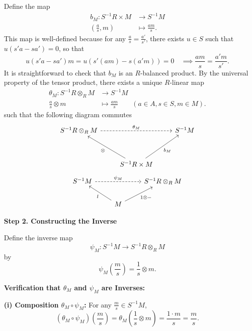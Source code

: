 \begin{prf}
Define the map
\begin{align*}
    b_M: S^{-1}R \times M &\longrightarrow S^{-1}M\\
    \left(\frac{a}{s}, m\right) &\longmapsto \frac{am}{s}.
\end{align*}
This map is well-defined because for any \(\frac{a}{s} = \frac{a'}{s'}\), there exists \(u \in S\) such that \(u(s'a - sa') = 0\), so that 
\[
u(s'a - sa')m = u(s'(am) - s(a'm))=0 \quad \implies \frac{am}{s} = \frac{a'm}{s'}.
\]
It is straightforward to check that \(b_M\) is an \(R\)-balanced product. By the universal property of the tensor product, there exists a unique \(R\)-linear map
\begin{align*}
    \theta_M: S^{-1}R\otimes_R M &\longrightarrow S^{-1}M\\
    \frac{a}{s} \otimes m &\longmapsto \frac{am}{s}\qquad(a \in A, s \in S, m \in M).
\end{align*}
such that the following diagram commutes
\[
    \begin{tikzcd}
        S^{-1}R\otimes_R M \arrow[rr, "\theta_M", dashed] &                                                          & S^{-1}M \\[1.5em]
                                                        & S^{-1}R\times M \arrow[ru, "b_M"'] \arrow[lu, "\otimes"] &        
        \end{tikzcd}
\]
\[
    \begin{tikzcd}
        S^{-1}M \arrow[rr, "\psi_M", dashed] &                                          & S^{-1}R\otimes_R M \\
                                             & M \arrow[lu, "l"] \arrow[ru, "1\otimes -"'] &                   
        \end{tikzcd}
\]

\vspace{1em}
\textbf{Step 2. Constructing the Inverse}

Define the inverse map
\[
\psi_M: S^{-1}M \longrightarrow S^{-1}R \otimes_R M
\]
by
\[
\psi_M\left(\frac{m}{s}\right) = \frac{1}{s} \otimes m.
\]

\textbf{Verification that \(\theta_M\) and \(\psi_M\) are Inverses:}

\textbf{(i) Composition \(\theta_M \circ \psi_M\):} For any \(\frac{m}{s} \in S^{-1}M\),
\[
(\theta_M \circ \psi_M)\left(\frac{m}{s}\right) = \theta_M\left(\frac{1}{s} \otimes m\right) = \frac{1\cdot m}{s} = \frac{m}{s}.
\]


\end{prf}
